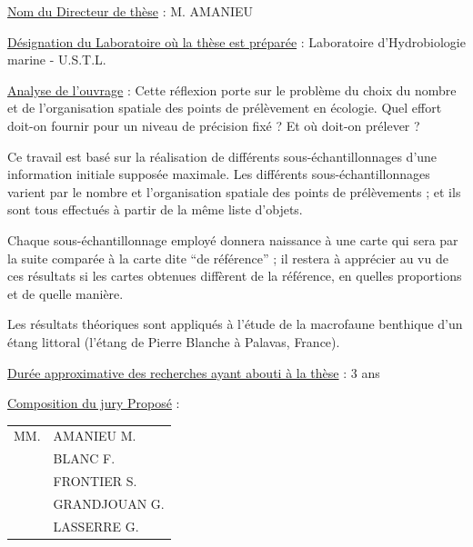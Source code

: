 \uline{Nom du Directeur de thèse} : M. AMANIEU

\uline{Désignation du Laboratoire où la thèse est préparée} : Laboratoire d'Hydrobiologie marine - U.S.T.L.

\uline{Analyse de l'ouvrage} : Cette réflexion porte sur le problème du choix du nombre et de l'organisation spatiale des points de prélèvement en écologie. Quel effort doit-on fournir pour un niveau de précision fixé ? Et où doit-on prélever ?

Ce travail est basé sur la réalisation de différents sous-échantillonnages d'une information initiale supposée maximale. Les différents sous-échantillonnages varient par le nombre et l'organisation spatiale des points de prélèvements ; et ils sont tous effectués à partir de la même liste d'objets.

Chaque sous-échantillonnage employé donnera naissance à une carte qui sera par la suite comparée à la carte dite ``de référence'' ; il restera à apprécier au vu de ces résultats si les cartes obtenues diffèrent de la référence, en quelles proportions et de quelle manière.

Les résultats théoriques sont appliqués à l'étude de la macrofaune benthique d'un étang littoral (l'étang de Pierre Blanche à Palavas, France).

\uline{Durée approximative des recherches ayant abouti à la thèse} : 3 ans

\uline{Composition du jury Proposé} : \begin{tabular}[t]{ll}
MM. & AMANIEU M.\\
& BLANC F.\\
& FRONTIER S.\\
& GRANDJOUAN G.\\
& LASSERRE G.
\end{tabular}

